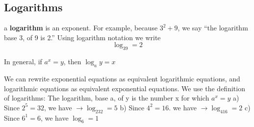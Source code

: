 \documentclass{report}
\begin{document}
\subsection*{\LARGE{Logarithms}}
\bigbreak \noindent
\begin{mdframed}
\begin{minipage}{0.5\textwidth}
  a \textbf{logarithm} is an exponent. For example, because $3^2 + 9 $, we say ``the logarithm base 3, of 9 is 2.'' Using logarithm notation we write
  $$\log_39=2$$
  \vspace{3mm}
  
  In general, if $a^x = y$, then $\log_ay=x$
\end{minipage}
\hspace{10mm}\begin{minipage}{0.4\textwidth}
  \vspace{3mm}

\vspace{2mm}
\end{minipage}
\end{mdframed}
\bigbreak \noindent  
We can rewrite exponential equations as equivalent logarithmic equations, and logarithmic equations as equivalent exponential equations.
\bigbreak \noindent
{}
\bigbreak \noindent
\sol
\bigbreak \noindent
We use the definition of logarithms: The logarithm, base a, of y is the number x for which $a^x = y$
\bigbreak \noindent
a) Since $2^5 = 32$, we have $\rightarrow \log_232=5$
\bigbreak \noindent
b) Since $4^2 = 16$. we have $ \rightarrow \log_416=2$
\bigbreak \noindent
c) Since $6^1 = 6$, we have $\log_6 = 1$
\bigbreak \noindent
\end{document}
